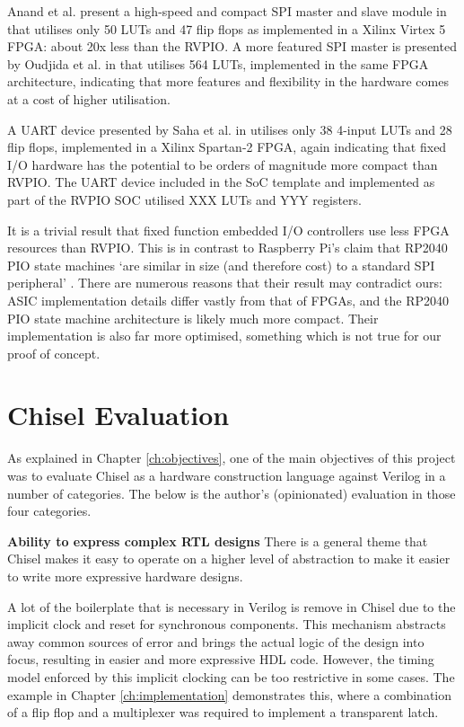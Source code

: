Anand et al. present a high-speed and compact SPI master and slave module in \cite{spi-device} that utilises only 50 LUTs and 47 flip flops as implemented in a Xilinx Virtex 5 FPGA: about 20x less than the RVPIO. A more featured SPI master is presented by Oudjida et al. in \cite{spi-i2c} that utilises 564 LUTs, implemented in the same FPGA architecture, indicating that more features and flexibility in the hardware comes at a cost of higher utilisation.

A UART device presented by Saha et al. in \cite{uart-device} utilises only 38 4-input LUTs and 28 flip flops, implemented in a Xilinx Spartan-2 FPGA, again indicating that fixed I/O hardware has the potential to be orders of magnitude more compact than RVPIO. The UART device included in the SoC template and implemented as part of the RVPIO SOC utilised XXX LUTs and YYY registers.

It is a trivial result that fixed function embedded I/O controllers use less FPGA resources than RVPIO. This is in contrast to Raspberry Pi's claim that RP2040 PIO state machines `are similar in size (and therefore cost) to a standard SPI peripheral' \cite{picosdk}. There are numerous reasons that their result may contradict ours: ASIC implementation details differ vastly from that of FPGAs, and the RP2040 PIO state machine architecture is likely much more compact. Their implementation is also far more optimised, something which is not true for our proof of concept.

\section{Chisel Evaluation}

As explained in Chapter \ref{ch:objectives}, one of the main objectives of this project was to evaluate Chisel as a hardware construction language against Verilog in a number of categories. The below is the author's (opinionated) evaluation in those four categories.

\textbf{Ability to express complex RTL designs}
There is a general theme that Chisel makes it easy to operate on a higher level of abstraction to make it easier to write more expressive hardware designs.

A lot of the boilerplate that is necessary in Verilog is remove in Chisel due to the implicit clock and reset for synchronous components. This mechanism abstracts away common sources of error and brings the actual logic of the design into focus, resulting in easier and more expressive HDL code. However, the timing model enforced by this implicit clocking can be too restrictive in some cases. The example in Chapter \ref{ch:implementation} demonstrates this, where a combination of a flip flop and a multiplexer was required to implement a transparent latch.

